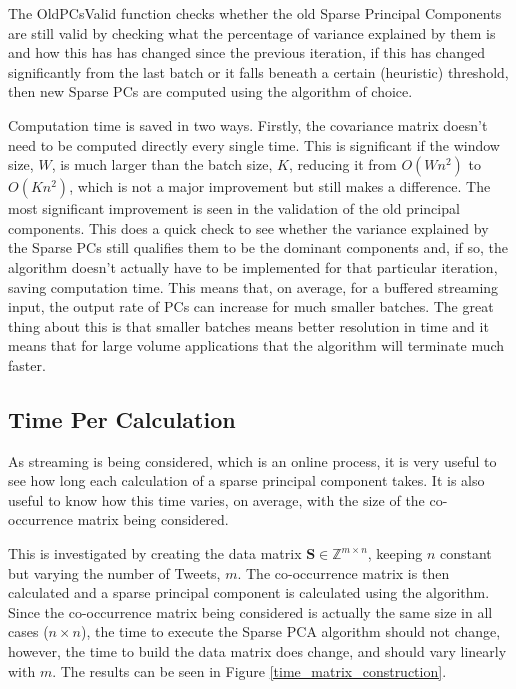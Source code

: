 \documentclass[11pt,a4paper]{article}
\newcommand{\inintmxn}{\in \mathbb{Z}^{m\times n}}
\newcommand{\smat}{\mathbf{S}}
\begin{document}
The OldPCsValid function checks whether the old Sparse Principal Components are still valid by checking what the percentage of variance explained by them is and how this has has changed since the previous iteration, if this has changed significantly from the last batch or it falls beneath a certain (heuristic) threshold, then new Sparse PCs are computed using the algorithm of choice. 

Computation time is saved in two ways. Firstly, the covariance matrix doesn't need to be computed directly every single time. This is significant if the window size, $W$, is much larger than the batch size, $K$, reducing it from $O(Wn^2)$ to $O(Kn^2)$, which is not a major improvement but still makes a difference. The most significant improvement is seen in the validation of the old principal components. This does a quick check to see whether the variance explained by the Sparse PCs still qualifies them to be the dominant components and, if so, the algorithm doesn't actually have to be implemented for that particular iteration, saving computation time. This means that, on average, for a buffered streaming input, the output rate of PCs can increase for much smaller batches. The great thing about this is that smaller batches means better resolution in time and it means that for large volume applications that the algorithm will terminate much faster.

\subsection{Time Per Calculation}
As streaming is being considered, which is an online process, it is very useful to see how long each calculation of a sparse principal component takes. It is also useful to know how this time varies, on average, with the size of the co-occurrence matrix being considered.

This is investigated by creating the data matrix $\smat \inintmxn$, keeping $n$ constant but varying the number of Tweets, $m$. The co-occurrence matrix is then calculated and a sparse principal component is calculated using the algorithm. Since the co-occurrence matrix being considered is actually the same size in all cases ($n \times n$), the time to execute the Sparse PCA algorithm should not change, however, the time to build the data matrix does change, and should vary linearly with $m$. The results can be seen in Figure \ref{time_matrix_construction}.
\end{document}

